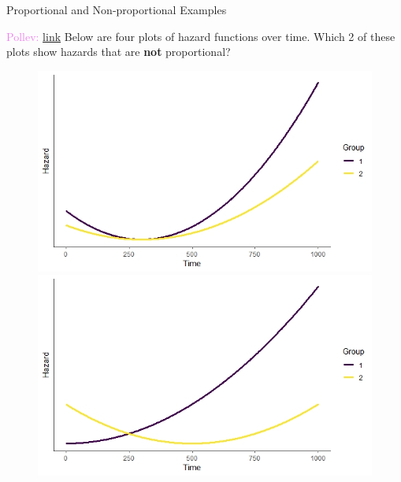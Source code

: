 \documentclass[10pt,t]{beamer}
\begin{document}
\begin{frame}{Proportional and Non-proportional Examples}
	
	\vspace{-5 mm}
	
	\textcolor{violet}{Pollev: \href{https://PollEv.com/multiple_choice_polls/QNvYIE0VgwP95x35iBCgQ/respond}{link} }Below are four plots of hazard functions over time. Which 2 of these plots show hazards that are \textbf{not} proportional?
	
	\begin{figure}
		\centering
		\includegraphics[scale = 0.3]{figs/prop_hazard_1}
		\includegraphics[scale = 0.3]{figs/nonprop_hazard_2}
		

\end{figure}
\end{frame}
\end{document}
